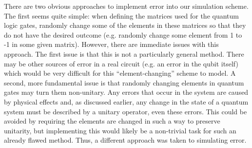 \documentclass{article}[11pt]
\begin{document}
There are two obvious approaches to implement error into our simulation scheme. The first seems quite simple: when defining the matrices used for the quantum logic gates, randomly change some of the elements in these matrices so that they do not have the desired outcome (e.g. randomly change some element from 1 to -1 in some given matrix). However, there are immediate issues with this approach. The first issue is that this is not a particularly general method. There may be other sources of error in a real circuit (e.g. an error in the qubit itself) which would be very difficult for this ``element-changing'' scheme to model. A second, more fundamental issue is that randomly changing elements in quantum gates may turn them non-unitary. Any errors that occur in the system are caused by physical effects and, as discussed earlier, any change in the state of a quantum system must be described by a unitary operator, even these errors. This could be avoided by requiring the elements are changed in such a way to preserve unitarity, but implementing this would likely be a non-trivial task for such an already flawed method. Thus, a different approach was taken to simulating error.
\end{document}
